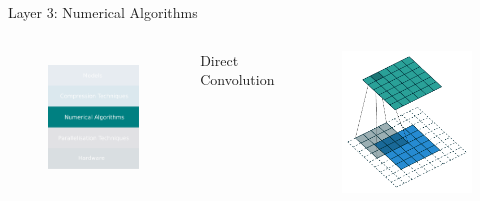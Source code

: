 \documentclass[xcolor=dvipsnames]{beamer}
\begin{document}
\begin{frame}{Layer 3: Numerical Algorithms}

\begin{columns}

\begin{figure}
    \centering
    \includegraphics[width=3.5cm]{images/numericals.pdf}
    \label{fig:inference-stack-nums-1}
\end{figure}


{\large Direct Convolution\footnotemark}

\begin{figure}
    \centering
    \includegraphics[width=5cm]{images/arbitrary_padding_no_strides_01.pdf}
\end{figure}

\end{columns}


\end{frame}
\end{document}
